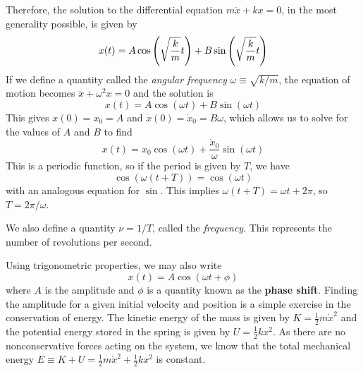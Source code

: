 Therefore, the solution to the differential equation $m\ddot x + kx = 0$, in the most generality possible, is given by
\[ x(t) = A\cos\pqty{\sqrt{\frac{k}{m}}t} + B\sin\pqty{\sqrt{\frac{k}{m}}t}\]
If we define a quantity called the \textit{angular frequency} $\omega\equiv \sqrt{k/m}$, the equation of motion becomes $\ddot x + \omega^2 x = 0$ and the solution is
\[ x(t) = A\cos(\omega t) + B\sin(\omega t) \]
This gives $x(0) = x_0 = A$ and $\dot x(0) = \dot x_0 = B\omega$, which allows us to solve for the values of $A$ and $B$ to find
\begin{equation}\label{superpos}
    x(t) = x_0\cos(\omega t) + \frac{\dot x_0}{\omega }\sin(\omega t)
\end{equation}
This is a periodic function, so if the period is given by $T$, we have
\[ \cos(\omega(t + T)) = \cos(\omega t) \]
with an analogous equation for $\sin$. This implies $\omega (t + T) = \omega t + 2\pi$, so $T = 2\pi/\omega$.

We also define a quantity $\nu = 1/T$, called the \textit{frequency}. This represents the number of revolutions per second.

Using trigonometric properties, we may also write
\[ x(t) = A\cos(\omega t + \phi) \]
where $A$ is the amplitude and $\phi$ is a quantity known as the \textbf{phase shift}. Finding the amplitude for a given initial velocity and position is a simple exercise in the conservation of energy. The kinetic energy of the mass is given by $K = \frac{1}{2}m\dot x^2$ and the potential energy stored in the spring is given by $U = \frac{1}{2}kx^2$. As there are no nonconservative forces acting on the system, we know that the total mechanical energy $E\equiv K+U = \frac{1}{2}m\dot x^2 + \frac{1}{2}kx^2$ is constant. 

